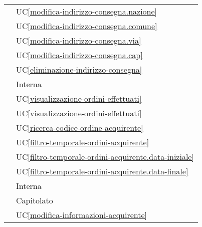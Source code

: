 \begin{longtable}{C{6cm} C{6cm}}
     & UC\ref{modifica-indirizzo-consegna.nazione} \\

     & UC\ref{modifica-indirizzo-consegna.comune} \\

     & UC\ref{modifica-indirizzo-consegna.via} \\

     & UC\ref{modifica-indirizzo-consegna.cap} \\

     & UC\ref{eliminazione-indirizzo-consegna} \\

     & Interna \\

     & UC\ref{visualizzazione-ordini-effettuati} \\

     & UC\ref{visualizzazione-ordini-effettuati} \\

     & UC\ref{ricerca-codice-ordine-acquirente} \\

     & UC\ref{filtro-temporale-ordini-acquirente} \\

     & UC\ref{filtro-temporale-ordini-acquirente.data-iniziale} \\

     & UC\ref{filtro-temporale-ordini-acquirente.data-finale} \\

     & Interna \\

     & Capitolato \\

     & UC\ref{modifica-informazioni-acquirente} \\


\end{longtable}
